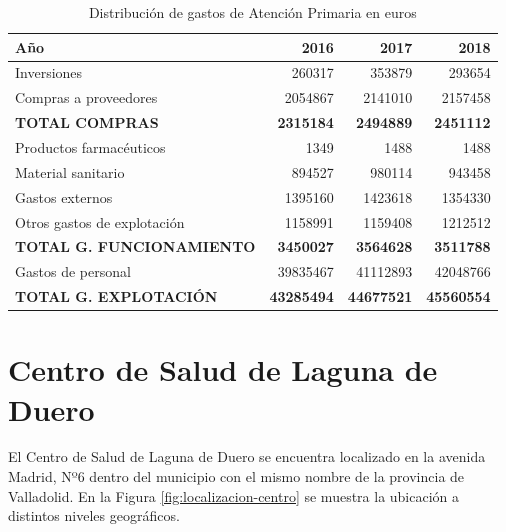 \begin{table}[H]
    \centering
    \begin{tabular}{lrrr}
        \toprule
        Año                              & 2016              & 2017              & 2018              \\
        \midrule
        Inversiones                      & 260317            & 353879            & 293654            \\
        Compras a proveedores            & 2054867           & 2141010           & 2157458           \\
        \textbf{TOTAL COMPRAS}           & \textbf{2315184}  & \textbf{2494889}  & \textbf{2451112}  \\
        \midrule
        Productos farmacéuticos          & 1349              & 1488              & 1488              \\
        Material sanitario               & 894527            & 980114            & 943458            \\
        Gastos externos                  & 1395160           & 1423618           & 1354330           \\
        Otros gastos de explotación      & 1158991           & 1159408           & 1212512           \\

        \textbf{TOTAL G. FUNCIONAMIENTO} & \textbf{3450027}  & \textbf{3564628}  & \textbf{3511788}  \\
        \midrule
        Gastos de personal               & 39835467          & 41112893          & 42048766          \\
        \textbf{TOTAL G. EXPLOTACIÓN}    & \textbf{43285494} & \textbf{44677521} & \textbf{45560554} \\
        \bottomrule
    \end{tabular}
    \caption{Distribución de gastos de Atención Primaria en euros}
    \label{tab:gastos-primaria}
\end{table}

\section{Centro de Salud de Laguna de Duero}

El Centro de Salud de Laguna de Duero se encuentra localizado en la avenida Madrid, Nº6 dentro del municipio con el mismo nombre de la provincia de Valladolid. En la Figura \ref{fig:localizacion-centro} se muestra la ubicación a distintos niveles geográficos.

